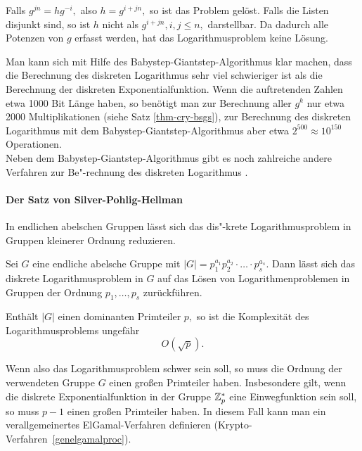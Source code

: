\begin{refsegment}
\begin{Beweis}{}
Falls $ g^{jn} = hg^{-i}, $ also $ h = g^{i+jn}, $ so ist das Problem gelöst. Falls
die Listen disjunkt sind, so ist $ h $ nicht als $ g^{i + jn}, i, j\leq n,$ darstellbar.
Da dadurch alle Potenzen von $ g $ erfasst werden, hat das Logarithmusproblem keine Lösung.
\end{Beweis}

Man kann sich mit Hilfe des Babystep-Giantstep-Algorithmus klar machen, dass die Berechnung des diskreten Logarithmus sehr viel schwieriger ist als die Berechnung der diskreten Exponentialfunktion. Wenn die auftretenden Zahlen etwa 1000 Bit Länge haben, so benötigt man zur Berechnung aller $ g^k $ nur etwa 2000 Multiplikationen (siehe Satz \ref{thm-cry-bsgs}), zur Berechnung des diskreten Logarithmus mit dem Babystep-Giantstep-Algorithmus aber etwa $ 2^{500} \approx 10^{150} $ Operationen.\\
Neben dem Babystep-Giantstep-Algorithmus gibt es noch zahlreiche andere Verfahren zur Be"-rechnung des diskreten Logarithmus \cite{Stin2006}.

\paragraph*{Der Satz von Silver-Pohlig-Hellman}
In endlichen abelschen Gruppen lässt sich das  dis"-krete Logarithmusproblem in Gruppen kleinerer Ordnung reduzieren.

\begin{satz}\label{thm-cry-pohe}
Sei $ G $ eine endliche abelsche Gruppe mit $ |G|= p_1^{a_1} p_2^{a_2} \cdot \ldots \cdot p_s^{a_s}. $ Dann lässt sich das diskrete Logarithmusproblem in $ G $ auf das Lösen von Logarithmenproblemen in Gruppen der Ordnung $ p_1, \ldots , p_s $ zurückführen.
\end{satz}

\noindent Enthält $ |G| $ einen \glqq dominanten\grqq {} Primteiler $ p ,$ so ist die Komplexität  des Logarithmusproblems ungefähr
\[ O(\sqrt{p}). \]

\noindent Wenn also das Logarithmusproblem schwer sein soll, so muss die Ordnung der verwendeten Gruppe $ G $ einen großen Primteiler haben. Insbesondere gilt, wenn die diskrete Exponentialfunktion in der Gruppe $ \mathbf{\mathbb{Z}}_p^{\ast} $ eine Einwegfunktion sein soll, so muss $ p -1 $ einen großen Primteiler haben. In diesem Fall kann man ein verallgemeinertes ElGamal-Verfahren definieren (Krypto-Verfahren~\ref{genelgamalproc}).


\end{refsegment}
